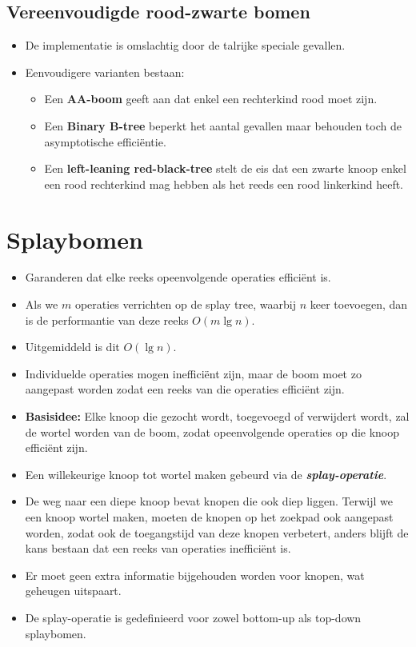 \subsection{Vereenvoudigde rood-zwarte bomen}
\begin{itemize}
    \item De implementatie is omslachtig door de talrijke speciale gevallen.
    \item Eenvoudigere varianten bestaan:
    \begin{itemize}
        \item Een \textbf{AA-boom} geeft aan dat enkel een rechterkind rood moet zijn.
        \item Een \textbf{Binary B-tree} beperkt het aantal gevallen maar behouden toch de asymptotische efficiëntie.
        \item Een \textbf{left-leaning red-black-tree} stelt de eis dat een zwarte knoop enkel een rood rechterkind mag hebben als het reeds een rood linkerkind heeft.
    \end{itemize}
\end{itemize}
\section{Splaybomen}
\label{sec:splaybomen}
\begin{itemize}
    \item Garanderen dat elke reeks opeenvolgende operaties efficiënt is.
    \item Als we $m$ operaties verrichten op de splay tree, waarbij $n$ keer toevoegen, dan is de performantie van deze reeks $O(m \lg n)$. 
    \item Uitgemiddeld is dit $O(\lg n)$.
    \item Individuelde operaties mogen inefficiënt zijn, maar de boom moet zo aangepast worden zodat een reeks van die operaties efficiënt zijn.
    \item \textbf{Basisidee:} Elke knoop die gezocht wordt, toegevoegd of verwijdert wordt, zal de wortel worden van de boom, zodat opeenvolgende operaties op die knoop efficiënt zijn.
    \item Een willekeurige knoop tot wortel maken gebeurd via de \textbf{\textit{splay-operatie}}.
    \item De weg naar een diepe knoop bevat knopen die ook diep liggen. Terwijl we een knoop wortel maken, moeten de knopen op het zoekpad ook aangepast worden, zodat ook de toegangstijd van deze knopen verbetert, anders blijft de kans bestaan dat een reeks van operaties inefficiënt is.
    \item Er moet geen extra informatie bijgehouden worden voor knopen, wat geheugen uitspaart. 
    \item De splay-operatie is gedefinieerd voor zowel bottom-up als top-down splaybomen.
\end{itemize}

